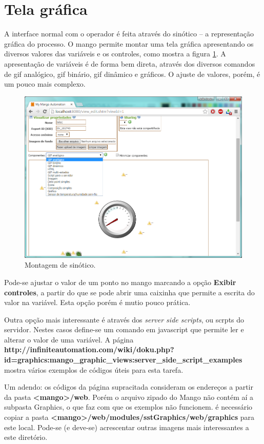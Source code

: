 \section{Tela gráfica}
A interface normal com o operador é feita através do sinótico -- a representação gráfica do processo. O mango permite montar uma tela gráfica apresentando os diversos valores das variáveis e os controles, como mostra a figura \ref{fig:mango_tela}. A apresentação de variáveis é de forma bem direta, através dos diversos comandos de gif analógico, gif binário, gif dinâmico e gráficos. O ajuste de valores, porém, é um pouco mais complexo.
\begin{figure}[hbt]
	\begin{center}
		\includegraphics[width=\textwidth]{figuras/mango_tela}
	\end{center}
	\caption{Montagem de sinótico.}
	\label{fig:mango_tela}
\end{figure}

Pode-se ajustar o valor de um ponto no mango marcando a opção \textbf{Exibir controles}, a partir do que se pode abrir uma caixinha que permite a escrita do valor na variável. Esta opção porém é mutio pouco prática.

Outra opção mais interessante é através dos \emph{server side scripts}, ou scrpts do servidor. Nestes casos define-se um comando em javascript que permite ler e alterar o valor de uma variável. A página \textbf{http://infiniteautomation.com/wiki/doku.php?id=graphics:mango\_graphic\_views:server\_side\_script\_examples} mostra vários exemplos de códigos úteis para esta tarefa. 

Um adendo: os códigos da página supracitada consideram os endereços a partir da pasta \textbf{<mango>/web}. Porém o arquivo zipado do Mango não contém aí a subpasta Graphics, o que faz com que os exemplos não funcionem. é necessário copiar a pasta \textbf{<mango>/web/modules/sstGraphics/web/graphics} para este local. Pode-se (e deve-se) acrescentar outras imagens mais interessantes a este diretório.